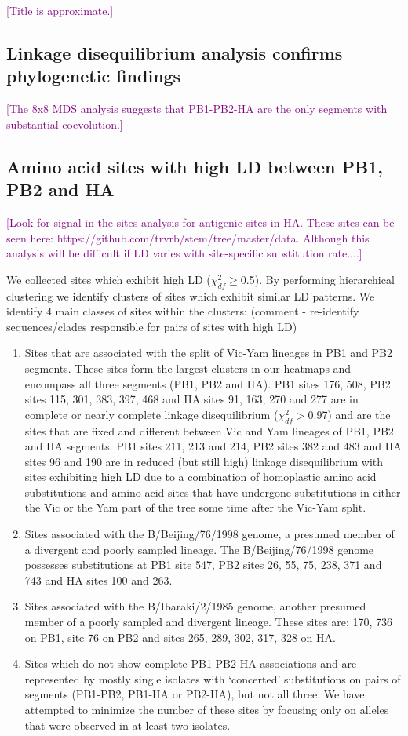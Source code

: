 \documentclass[11pt,oneside,letterpaper]{article}
\def\tbc#1{\textcolor{purple}{[#1]}}
\begin{document}
\tbc{Title is approximate.}

\subsection*{Linkage disequilibrium analysis confirms phylogenetic findings}

\tbc{The 8x8 MDS analysis suggests that PB1-PB2-HA are the only segments with substantial coevolution.}

\subsection*{Amino acid sites with high LD between PB1, PB2 and HA}

\tbc{Look for signal in the sites analysis for antigenic sites in HA.  These sites can be seen here: https://github.com/trvrb/stem/tree/master/data. Although this analysis will be difficult if LD varies with site-specific substitution rate....}

We collected sites which exhibit high LD ($\chi^{2}_{df}\ge$0.5).
By performing hierarchical clustering we identify clusters of sites which exhibit similar LD patterns.
We identify 4 main classes of sites within the clusters:
(comment - re-identify sequences/clades responsible for pairs of sites with high LD)
\begin{enumerate}
	\item Sites that are associated with the split of Vic-Yam lineages in PB1 and PB2 segments.
	These sites form the largest clusters in our heatmaps and encompass all three segments (PB1, PB2 and HA).
	PB1 sites 176, 508, PB2 sites 115, 301, 383, 397, 468 and HA sites 91, 163, 270 and 277 are in complete or nearly complete linkage disequilibrium ($\chi^{2}_{df}>$0.97) and are the sites that are fixed and different between Vic and Yam lineages of PB1, PB2 and HA segments.
	PB1 sites 211, 213 and 214, PB2 sites 382 and 483 and HA sites 96 and 190 are in reduced (but still high) linkage disequilibrium with sites exhibiting high LD due to a combination of homoplastic amino acid substitutions and amino acid sites that have undergone substitutions in either the Vic or the Yam part of the tree some time after the Vic-Yam split.
	\item Sites associated with the B/Beijing/76/1998 genome, a presumed member of a divergent and poorly sampled lineage.
	The B/Beijing/76/1998 genome possesses substitutions at PB1 site 547, PB2 sites 26, 55, 75, 238, 371 and 743 and HA sites 100 and 263.
	\item Sites associated with the B/Ibaraki/2/1985 genome, another presumed member of a poorly sampled and divergent lineage.
	These sites are: 170, 736 on PB1, site 76 on PB2 and sites 265, 289, 302, 317, 328 on HA.
	\item Sites which do not show complete PB1-PB2-HA associations and are represented by mostly single isolates with `concerted' substitutions on pairs of segments (PB1-PB2, PB1-HA or PB2-HA), but not all three.
	We have attempted to minimize the number of these sites by focusing only on alleles that were observed in at least two isolates.
\end{enumerate}
\end{document}
